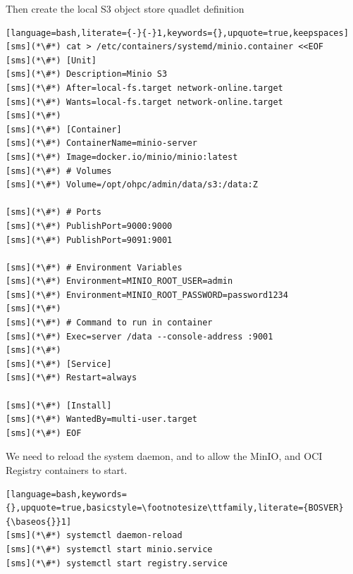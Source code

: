 Then create the local S3 object store quadlet definition
\begin{lstlisting}[language=bash,literate={-}{-}1,keywords={},upquote=true,keepspaces]
[sms](*\#*) cat > /etc/containers/systemd/minio.container <<EOF
[sms](*\#*) [Unit]
[sms](*\#*) Description=Minio S3
[sms](*\#*) After=local-fs.target network-online.target
[sms](*\#*) Wants=local-fs.target network-online.target
[sms](*\#*)
[sms](*\#*) [Container]
[sms](*\#*) ContainerName=minio-server
[sms](*\#*) Image=docker.io/minio/minio:latest
[sms](*\#*) # Volumes
[sms](*\#*) Volume=/opt/ohpc/admin/data/s3:/data:Z

[sms](*\#*) # Ports
[sms](*\#*) PublishPort=9000:9000
[sms](*\#*) PublishPort=9091:9001

[sms](*\#*) # Environment Variables
[sms](*\#*) Environment=MINIO_ROOT_USER=admin
[sms](*\#*) Environment=MINIO_ROOT_PASSWORD=password1234
[sms](*\#*)
[sms](*\#*) # Command to run in container
[sms](*\#*) Exec=server /data --console-address :9001
[sms](*\#*)
[sms](*\#*) [Service]
[sms](*\#*) Restart=always

[sms](*\#*) [Install]
[sms](*\#*) WantedBy=multi-user.target
[sms](*\#*) EOF
\end{lstlisting}

We need to reload the system daemon, and to allow the MinIO,
and OCI Registry containers to start.

\begin{lstlisting}[language=bash,keywords={},upquote=true,basicstyle=\footnotesize\ttfamily,literate={BOSVER}{\baseos{}}1]
[sms](*\#*) systemctl daemon-reload
[sms](*\#*) systemctl start minio.service
[sms](*\#*) systemctl start registry.service
\end{lstlisting}
